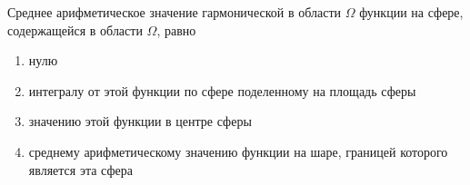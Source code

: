 Среднее арифметическое значение гармонической в области \(\Omega\) функции на сфере, содержащейся в области \(\Omega\), равно

\begin{enumerate}[label=\arabic*)]
    \item нулю
    \item интегралу от этой функции по сфере поделенному на площадь сферы
    \item значению этой функции в центре сферы
    \item среднему арифметическому значению функции на шаре, границей которого является эта сфера
\end{enumerate}

